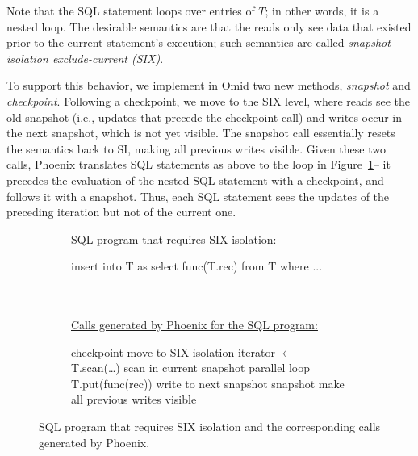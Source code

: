 Note that the SQL statement loops over entries of $T$; in other words, it is a nested loop. 
The desirable semantics are that the reads only see  data that existed prior to the 
current statement's execution; such semantics are called 
\emph{snapshot isolation exclude-current (SIX)}.

To support this behavior, we implement in Omid two new methods, {\em snapshot\/} and {\em checkpoint}.
Following a checkpoint, we move to the SIX level, where reads see the old snapshot (i.e., updates that
precede the checkpoint call) and writes occur in the next snapshot, which is not yet visible.
The snapshot call essentially resets the semantics back to SI, making all previous writes visible.
Given these two calls, Phoenix translates SQL statements as above to the loop in Figure~\ref{alg:six}-- 
it precedes the evaluation of the nested SQL statement with a checkpoint, and follows it with a snapshot.
Thus, each SQL statement sees the updates of the preceding iteration but not of the current one. 

\begin{figure}
\begin{subfigure}[tb]{\columnwidth}
\underline{\hspace{\columnwidth}}
\underline{\small SQL program that requires SIX isolation:}
\begin{algorithmic}
\State insert into T as select func(T.rec) from T  where ... 
\EndFor
\end{algorithmic}
\end{subfigure}
\begin{subfigure}[tb]{\columnwidth}
\ \\ \\
\underline{\small Calls generated by Phoenix for the SQL program:}
\begin{algorithmic}
\State checkpoint \Comment move to SIX isolation
\State iterator $\leftarrow$ T.scan(\dots) \Comment scan in current snapshot
 \Comment parallel loop
    \State T.put(func(rec)) \Comment write to next snapshot              
\EndFor
\State snapshot  \Comment make all previous writes visible
\EndFor
\end{algorithmic}
\underline{\hspace{\columnwidth}}
\end{subfigure}
\caption{  SQL program that requires SIX isolation and the corresponding calls generated by Phoenix.}
\label{alg:six}
\end{figure}

